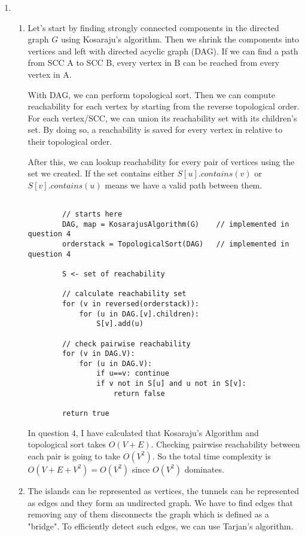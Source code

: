 \documentclass{article}
\begin{document}
\begin{enumerate}
  \item
  \begin{enumerate}
    \item Let's start by finding strongly connected components in the directed graph $G$ using Kosaraju's algorithm.
    Then we shrink the components into vertices and left with directed acyclic graph (DAG).
    If we can find a path from SCC A to SCC B, every vertex in B can be reached from every vertex in A.

    With DAG, we can perform topological sort.
    Then we can compute reachability for each vertex by starting from the reverse topological order.
    For each vertex/SCC, we can union its reachability set with its children's set.
    By doing so, a reachability is saved for every vertex in relative to their topological order.

    After this, we can lookup reachability for every pair of vertices using the set we created.
    If the set contains either $S[u].contains(v)$ or $S[v].contains(u)$ means we have a valid path between them.

    \begin{lstlisting}
        
        // starts here
        DAG, map = KosarajusAlgorithm(G)    // implemented in question 4
        orderstack = TopologicalSort(DAG)   // implemented in question 4

        S <- set of reachability

        // calculate reachability set
        for (v in reversed(orderstack)):
            for (u in DAG.[v].children):
                S[v].add(u)
        
        // check pairwise reachability
        for (v in DAG.V):
            for (u in DAG.V):
                if u==v: continue
                if v not in S[u] and u not in S[v]:
                    return false
        
        return true

    \end{lstlisting}

    In question 4, I have calculated that Kosaraju's Algorithm and topological sort takes $O(V+E)$.
    Checking pairwise reachability between each pair is going to take $O(V^2)$.
    So the total time complexity is $O(V+E+V^2)=O(V^2)$ since $O(V^2)$ dominates.

    \item The islands can be represented as vertices, the tunnels can be represented as edges and they form an undirected graph.
    We have to find edges that removing any of them disconnects the graph which is defined as a "bridge".
    To efficiently detect such edges, we can use Tarjan's algorithm.


\end{enumerate}
\end{enumerate}
\end{document}
